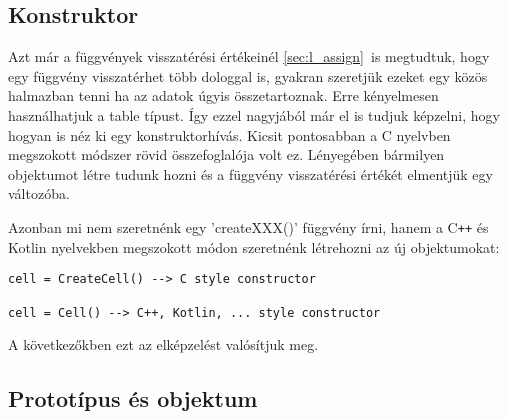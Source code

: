 \subsection{Konstruktor}
\label{subsec:l_constructor}

Azt már a függvények visszatérési értékeinél \ref{sec:l_assign}~is megtudtuk, hogy egy függvény visszatérhet több dologgal is, gyakran szeretjük ezeket egy közös halmazban tenni ha az adatok úgyis összetartoznak. Erre kényelmesen használhatjuk a table típust. Így ezzel nagyjából már el is tudjuk képzelni, hogy hogyan is néz ki egy konstruktorhívás. Kicsit pontosabban a C nyelvben megszokott módszer rövid összefoglalója volt ez. Lényegében bármilyen objektumot létre tudunk hozni és a függvény visszatérési értékét elmentjük egy változóba. 

Azonban mi nem szeretnénk egy 'createXXX()' függvény írni, hanem a C\verb|++| és Kotlin nyelvekben megszokott módon szeretnénk létrehozni az új objektumokat:
\scriptsize
\begin{lstlisting}
cell = CreateCell() --> C style constructor

cell = Cell() --> C++, Kotlin, ... style constructor
\end{lstlisting}
\normalsize
A következőkben ezt az elképzelést valósítjuk meg.

\subsection{Prototípus és objektum}
\label{subsec:l_classNobj}

